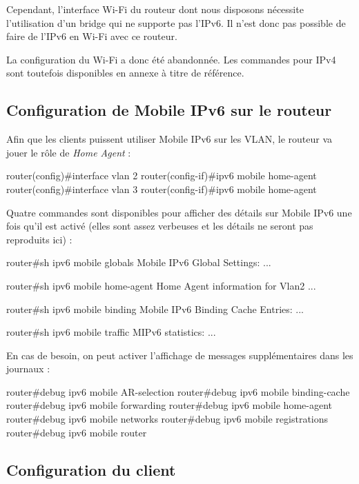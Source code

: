 Cependant, l'interface Wi-Fi du routeur dont nous disposons nécessite l'utilisation d'un bridge qui ne supporte pas l'IPv6.
Il n'est donc pas possible de faire de l'IPv6 en Wi-Fi avec ce routeur.

La configuration du Wi-Fi a donc été abandonnée.
Les commandes pour IPv4 sont toutefois disponibles en annexe à titre de référence.

\subsection{Configuration de Mobile IPv6 sur le routeur}

Afin que les clients puissent utiliser Mobile IPv6 sur les VLAN, le routeur va jouer le rôle de \emph{Home Agent} :

\begin{code}
router(config)#interface vlan 2
router(config-if)#ipv6 mobile home-agent
router(config)#interface vlan 3
router(config-if)#ipv6 mobile home-agent
\end{code}

Quatre commandes sont disponibles pour afficher des détails sur Mobile IPv6 une fois qu'il est activé (elles sont assez verbeuses et les détails ne seront pas reproduits ici) :

\begin{code}
router#sh ipv6 mobile globals
Mobile IPv6 Global Settings:
...

router#sh ipv6 mobile home-agent
Home Agent information for Vlan2
...

router#sh ipv6 mobile binding 
Mobile IPv6 Binding Cache Entries:
...

router#sh ipv6 mobile traffic
MIPv6 statistics:
...
\end{code}

En cas de besoin, on peut activer l'affichage de messages supplémentaires dans les journaux :

\begin{code}
router#debug ipv6 mobile AR-selection
router#debug ipv6 mobile binding-cache
router#debug ipv6 mobile forwarding 
router#debug ipv6 mobile home-agent   
router#debug ipv6 mobile networks    
router#debug ipv6 mobile registrations      
router#debug ipv6 mobile router 
\end{code}

\subsection{Configuration du client}

